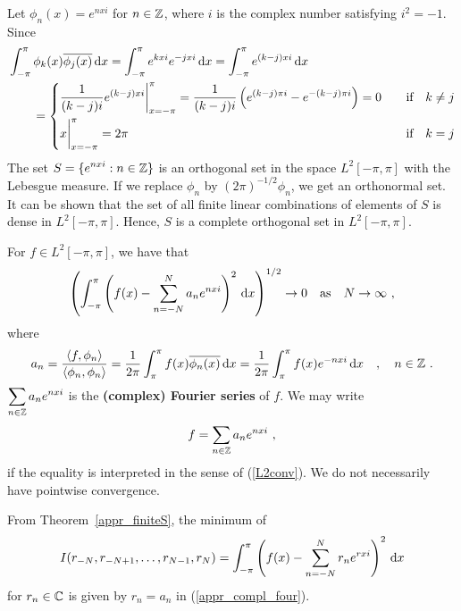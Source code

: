 \begin{egg}
Let $\displaystyle \phi_n(x) = e^{n x i}$ for $n \in \mathbb{Z}$, where $i$
is the complex number satisfying $i^2=-1$.  Since
\begin{align*}
&\int_{-\pi}^\pi \phi_k(x) \overline{\phi_j(x)} \,\mathrm{d}x
= \int_{-\pi}^\pi e^{kx i} e^{-jx i} \,\mathrm{d}x
= \int_{-\pi}^\pi e^{(k-j)x i} \,\mathrm{d}x \\
& \qquad =
\begin{cases}
\displaystyle \frac{1}{(k-j)i} e^{(k-j)x i}\bigg|_{x=-\pi}^{\pi} =
\frac{1}{(k-j)i} \left( e^{(k-j)\pi i} - e^{-(k-j)\pi i}\right) = 0 &
\quad \text{if} \quad k \neq j \\[1em]
\displaystyle x\bigg|_{x=-\pi}^{\pi} = 2\pi & \quad \text{if} \quad k = j
\end{cases}
\end{align*}
The set $\displaystyle S = \{ e^{n x i} : n\in \mathbb{Z}\}$ is an orthogonal
set in the space $L^2[-\pi,\pi]$ with the Lebesgue measure.  If we
replace $\phi_n$ by $(2\pi)^{-1/2} \phi_n$, we get an orthonormal set.
It can be shown that the set of all finite linear combinations
of elements of $S$ is dense in $L^2[-\pi,\pi]$.  Hence, $S$ is a
complete orthogonal set in $L^2[-\pi,\pi]$.

For $f\in L^2[-\pi,\pi]$, we have that
\begin{equation}\label{L2conv}
\left( \int_{-\pi}^\pi \left( f(x) - \sum_{n=-N}^{N} a_n e^{nx i} \right)^2
\,\mathrm{d}x \right)^{1/2} \rightarrow 0 \quad \text{as} \quad
N \rightarrow \infty \ ,
\end{equation}
where
\begin{equation} \label{appr_compl_four}
a_n = \frac{\left\langle{f} , {\phi_n}\right\rangle}{\left\langle{\phi_n} , {\phi_n}\right\rangle}
= \frac{1}{2\pi} \int_{\pi}^\pi f(x)\overline{\phi_n(x)} \,\mathrm{d}x
= \frac{1}{2\pi} \int_{\pi}^\pi f(x) e^{-nx i} \,\mathrm{d}x
\quad , \quad n \in \mathbb{Z} \ .
\end{equation}
$\displaystyle \sum_{n\in \mathbb{Z}} a_n e^{nx i}$
is the
{\bfseries (complex) Fourier series} of $f$.  We may write
\[
f = \sum_{n\in \mathbb{Z}} a_n e^{nx i} \ ,
\]
if the equality is interpreted in the sense of (\ref{L2conv}).  We do
not necessarily have pointwise convergence.

From Theorem~\ref{appr_finiteS}, the minimum of
\[
I(r_{-N}, r_{-N+1}, \ldots , r_{N-1}, r_N)
= \int_{-\pi}^\pi \left( f(x) - \sum_{n=-N}^{N} r_n e^{rx i} \right)^2 \,\mathrm{d}x
\]
for $r_n \in \mathbb{C}$ is given by $r_n = a_n$ in (\ref{appr_compl_four}).
\label{appr_egg_complex_poly}
\end{egg}

